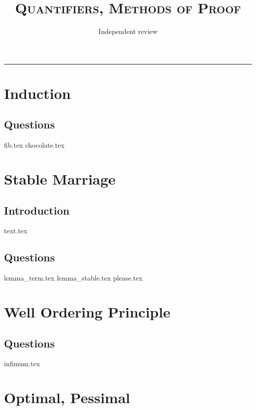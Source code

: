 \documentclass{exam}
\title{\textsc{Quantifiers, Methods of Proof}}
\date{Independent review}
\begin{document}
\maketitle
\rule{\textwidth}{0.15em}
\fontsize{12}{15}\selectfont
\thispagestyle{empty}

\section{Induction}
\subsection{Questions}
\begin{questions}
{fib.tex}
{chocolate.tex}
\end{questions}

\section{Stable Marriage}
\subsection{Introduction}
{text.tex}
\subsection{Questions}
\begin{questions}
{lemma_term.tex}
{lemma_stable.tex}
{please.tex}
\end{questions}

\section{Well Ordering Principle}
\subsection{Questions}
\begin{questions}
{infimum.tex}
\end{questions}

\section{Optimal, Pessimal}
\end{document}
